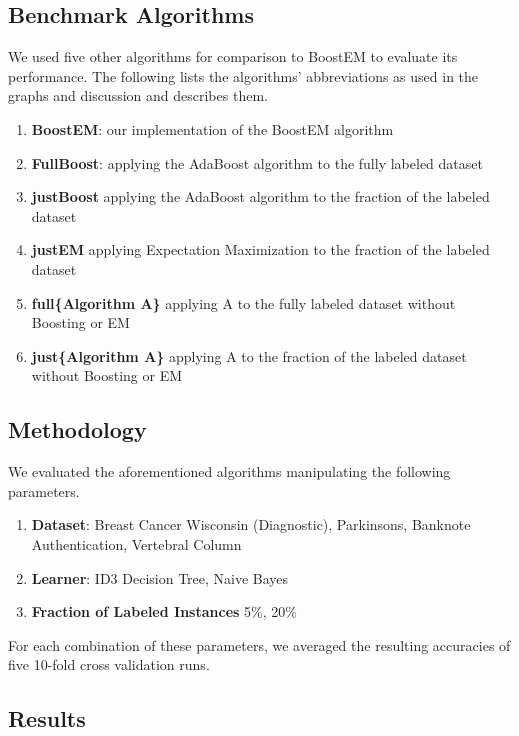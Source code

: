 \documentclass{sig-alternate}
\begin{document}
\subsection{Benchmark Algorithms}

We used five other algorithms for comparison to BoostEM to evaluate its performance. The following lists the algorithms' abbreviations as used in the graphs and discussion and describes them.

\begin{enumerate}
\item \textbf{BoostEM}: our implementation of the BoostEM algorithm
\item \textbf{FullBoost}: applying the AdaBoost algorithm to the fully labeled dataset
\item \textbf{justBoost} applying the AdaBoost algorithm to the fraction of the labeled dataset
\item \textbf{justEM} applying Expectation Maximization to the fraction of the labeled dataset
\item \textbf{full\{Algorithm A\}} applying A to the fully labeled dataset without Boosting or EM
\item \textbf{just\{Algorithm A\}} applying A to the fraction of the labeled dataset without Boosting or EM
\end{enumerate}

\subsection{Methodology}

We evaluated the aforementioned algorithms manipulating the following parameters.

\begin{enumerate}
\item \textbf{Dataset}: Breast Cancer Wisconsin (Diagnostic), Parkinsons, Banknote Authentication, Vertebral Column
\item \textbf{Learner}: ID3 Decision Tree, Naive Bayes
\item \textbf{Fraction of Labeled Instances} 5\%, 20\%
\end{enumerate}

For each combination of these parameters, we averaged the resulting accuracies of five 10-fold cross validation runs. 

\subsection{Results}
\end{document}
